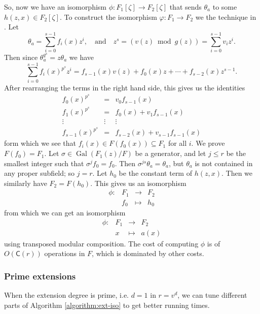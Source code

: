 \documentclass[12pt]{article}
\theoremstyle{plain}
\theoremstyle{definition}
\DeclareMathOperator{\gal}{Gal} %
\def\CC{\ensuremath{\mathsf{C}}}
\newcounter{algorithm}
\begin{document}
So, now we have an isomorphism $\phi: F_1[\zeta] \rightarrow F_2[\zeta]$ that sends $\theta_a$ to 
some $h(z, x) \in F_2[\zeta]$. To construct the isomorphism $\varphi: F_1 \rightarrow F_2$ we the 
technique in \cite{Allombert02}. Let 
\[ \theta_a = \sum_{i = 0}^{s - 1}f_i(x)z^i, \quad\text{and}\quad z^s = (v(z)  \bmod g(z)) = 
\sum_{i = 0}^{s - 1}v_iz^i. \] 
Then since $\theta_a^{q^s} = z\theta_a$ we have
\[ \sum_{i = 0}^{s - 1}f_i(x)^{p^s}z^i = f_{s - 1}(x)v(z) + f_0(x)z + \cdots + f_{s - 2}(x)z^{s - 
1}.\]
After rearranging the terms in the right hand side, this gives us the identities
\[
\begin{array}{ccc}
	f_0(x)^{p^s} & = & v_0f_{s - 1}(x) \\
	f_1(x)^{p^s} & = & f_0(x) + v_1f_{s - 1}(x) \\
	\vdots & \vdots & \vdots \\
	f_{s - 1}(x)^{p^s} & = & f_{s - 2}(x) + v_{s - 1}f_{s - 1}(x)
\end{array} 
\]
form which we see that $f_i(x) \in F(f_0(x)) \subseteq F_1$ for all $i$. We prove $F(f_0) = 
F_1$. Let $\sigma \in \gal(F_1(z) / F)$ be a generator, and let $j \le r$ be the smallest 
integer such that $\sigma^jf_0 = f_0$. Then $\sigma^{js}\theta_a = \theta_a$, but $\theta_a$ is not 
contained in any proper subfield; so $j = r$. Let $h_0$ be the constant term of $h(z, x)$. Then we 
similarly have $F_2 = F(h_0)$. This gives us an isomorphism
\[
\begin{array}{rlll}
	\phi: & F_1 & \longrightarrow & F_2 \\
	& f_0 & \longmapsto & h_0
\end{array}
\]
from which we can get an isomorphism
\[
\begin{array}{rlll}
	\phi: & F_1 & \longrightarrow & F_2 \\
	& x & \longmapsto & a(x)
\end{array}
\]
using transposed modular composition. The cost of computing $\phi$ is of $O(\CC(r))$ operations in 
$F$, which is dominated by other costs.


\subsubsection{Prime extensions}
\label{sec:kummer-prime}
When the extension degree is prime, i.e. $d = 1$ in $r = v^d$, we can tune different parts of 
Algorithm \ref{algorithm:ext-iso} to get better running times.
%
\end{document}
